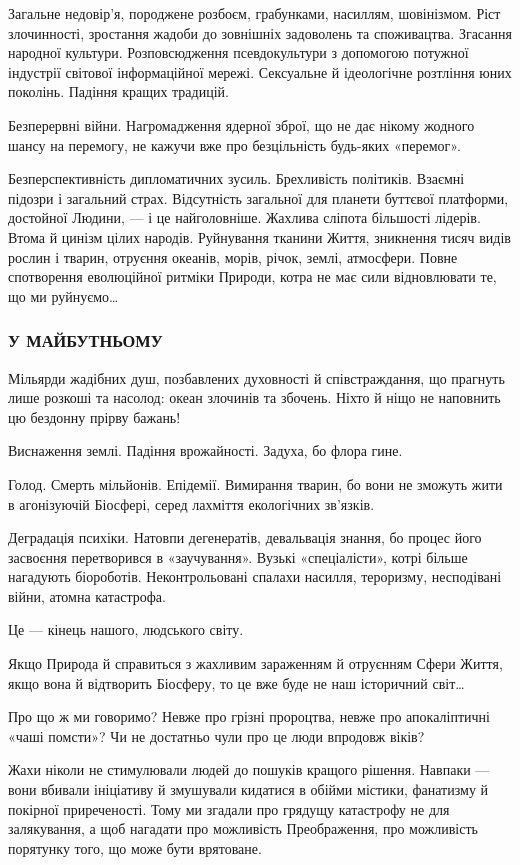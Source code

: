 Загальне недовір’я, породжене розбоєм, грабунками, насиллям, шовінізмом. Ріст
злочинності, зростання жадоби до зовнішніх задоволень та споживацтва. Згасання
народної культури. Розповсюдження псевдокультури з допомогою потужної індустрії
світової інформаційної мережі. Сексуальне й ідеологічне розтління юних
поколінь. Падіння кращих традицій.

Безперервні війни. Нагромадження ядерної зброї, що не дає нікому жодного шансу
на перемогу, не кажучи вже про безцільність будь-яких «перемог».

Безперспективність дипломатичних зусиль. Брехливість політиків. Взаємні підозри
і загальний страх. Відсутність загальної для планети буттєвої платформи,
достойної Людини, — і це найголовніше. Жахлива сліпота більшості лідерів. Втома
й цинізм цілих народів. Руйнування тканини Життя, зникнення тисяч видів рослин
і тварин, отруєння океанів, морів, річок, землі, атмосфери. Повне спотворення
еволюційної ритміки Природи, котра не має сили відновлювати те, що ми руйнуємо…

\subsubsection{У МАЙБУТНЬОМУ}

Мільярди жадібних душ, позбавлених духовності й співстраждання, що прагнуть
лише розкоші та насолод: океан злочинів та збочень. Ніхто й ніщо не наповнить
цю бездонну прірву бажань!

Виснаження землі. Падіння врожайності. Задуха, бо флора гине.

Голод. Смерть мільйонів. Епідемії. Вимирання тварин, бо вони не зможуть жити в
агонізуючій Біосфері, серед лахміття екологічних зв’язків.

Деградація психіки. Натовпи дегенератів, девальвація знання, бо процес його
засвоєння перетворився в «заучування». Вузькі «спеціалісти», котрі більше
нагадують біороботів. Неконтрольовані спалахи насилля, тероризму, несподівані
війни, атомна катастрофа.

Це — кінець нашого, людського світу.

Якщо Природа й справиться з жахливим зараженням й отруєнням Сфери Життя, якщо
вона й відтворить Біосферу, то це вже буде не наш історичний світ…

Про що ж ми говоримо? Невже про грізні пророцтва, невже про апокаліптичні «чаші
помсти»? Чи не достатньо чули про це люди впродовж віків?

Жахи ніколи не стимулювали людей до пошуків кращого рішення. Навпаки — вони
вбивали ініціативу й змушували кидатися в обійми містики, фанатизму й покірної
приреченості. Тому ми згадали про грядущу катастрофу не для залякування, а щоб
нагадати про можливість Преображення, про можливість порятунку того, що може
бути врятоване.

